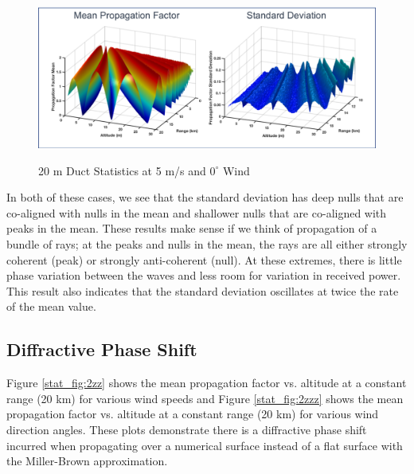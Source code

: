 \begin{figure}[H]
  \begin{center}
\includegraphics[width=5.5in]{../media/multistatic/duct_results.png}
  \end{center}
  \renewcommand{\baselinestretch}{1} \small\normalsize
  \begin{quote}
    \caption[20 m Duct Statistics at 5 m/s and $0^{\circ}$ Wind]{20 m Duct Statistics at 5 m/s and $0^{\circ}$ Wind\label{stat_fig:1zzz}}
  \end{quote}
\end{figure}
\renewcommand{\baselinestretch}{2} \small\normalsize

In both of these cases, we see that the standard deviation has deep nulls that are co-aligned with nulls in the mean and shallower nulls that are co-aligned with peaks in the mean. These results make sense if we think of propagation of a bundle of rays; at the peaks and nulls in the mean, the rays are all either strongly coherent (peak) or strongly anti-coherent (null). At these extremes, there is little phase variation between the waves and less room for variation in received power. This result also indicates that the standard deviation oscillates at twice the rate of the mean value.

\subsection{Diffractive Phase Shift}
Figure \ref{stat_fig:2zz} shows the mean propagation factor vs. altitude at a constant range (20 km) for various wind speeds and Figure \ref{stat_fig:2zzz} shows the mean propagation factor vs. altitude at a constant range (20 km) for various wind direction angles. These plots demonstrate there is a diffractive phase shift incurred when propagating over a numerical surface instead of a flat surface with the Miller-Brown approximation.

